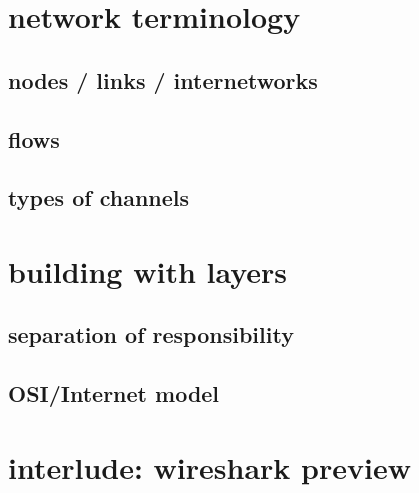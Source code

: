 \date{}
\title{}
\date{}

\begin{frame}
    \titlepage
\end{frame}

\section{network terminology}

\subsection{nodes / links / internetworks}



\subsection{flows}



\subsection{types of channels}



\section{building with layers}

\subsection{separation of responsibility}



\subsection{OSI/Internet model}



\section{interlude: wireshark preview}



